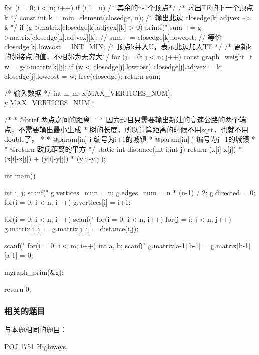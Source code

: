 \begin{Codex}[label=poj_1751_highways_prim.c]
{    for (i = 0; i < n; i++) if (i != u) { /* 其余的n-1个顶点*/
        /* 求出TE的下一个顶点k */
        const int k = min_element(closedge, n);
        /* 输出此边 closedge[k].adjvex --> k */
        if (g->matrix[closedge[k].adjvex][k] > 0)
            printf("%
        sum += g->matrix[closedge[k].adjvex][k];
        // sum += closedge[k].lowcost;  // 等价
        closedge[k].lowcost = INT_MIN;  /* 顶点k并入U，表示此边加入TE */
        /* 更新k的邻接点的值，不相邻为无穷大*/
        for (j = 0; j < n; j++) {
            const graph_weight_t w = g->matrix[k][j];
            if (w < closedge[j].lowcost) {
                closedge[j].adjvex = k;
                closedge[j].lowcost = w;
            }
        }
    }
    free(closedge);
    return sum;
}

/* 输入数据 */
int n, m, x[MAX_VERTICES_NUM], y[MAX_VERTICES_NUM];

/*
 * @brief 两点之间的距离.
 *
 * 因为题目只需要输出新建的高速公路的两个端点，不需要输出最小生成
 * 树的长度，所以计算距离的时候不用sqrt，也就不用double了。
 *
 * @param[in] i 编号为i+1的城镇
 * @param[in] j 编号为j+1的城镇
 *
 * @return 欧氏距离的平方
 */
static int distance(int i,int j) {
    return (x[i]-x[j]) * (x[i]-x[j]) + (y[i]-y[j]) * (y[i]-y[j]);
}

int main() {
    int i, j;
    scanf("%
    g.vertices_num = n;
    g.edges_num = n * (n-1) / 2;
    g.directed = 0;
    for(i = 0; i < n; i++) g.vertices[i] = i+1;

    for(i = 0; i < n; i++) scanf("%
    for(i = 0; i < n; i++)
        for(j = i; j < n; j++)
            g.matrix[i][j] = g.matrix[j][i] = distance(i,j);

    scanf("%
    for(i = 0; i < m; i++) {
        int a, b;
        scanf("%
        g.matrix[a-1][b-1] = g.matrix[b-1][a-1] = 0;
    }

    mgraph_prim(&g);

    return 0;
}
\end{Codex}

\subsubsection{相关的题目}
与本题相同的题目：
\begindot
\item POJ 1751 Highways, 
\myenddot

